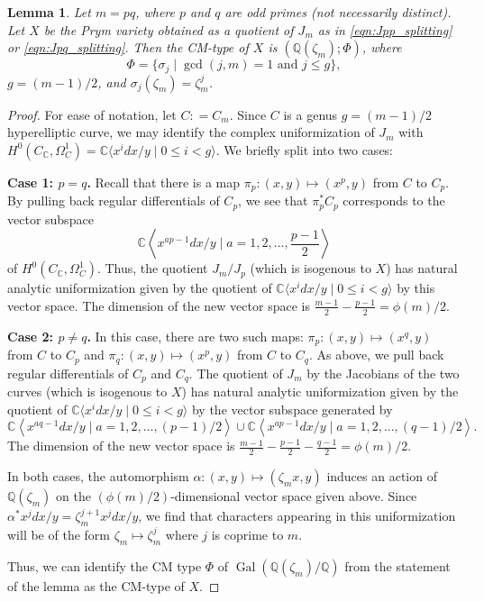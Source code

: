 \documentclass[10pt,a4paper]{amsart}
\newtheorem{lemma}{Lemma}
\newcommand{\C}{\mathbb{C}}
\DeclareMathOperator{\Gal}{Gal}
\newcommand{\Q}{\mathbb{Q}}
\begin{document}
\begin{lemma}\label{lemma:CMtype}
Let $m=pq$, where $p$ and $q$ are odd primes (not necessarily distinct). Let $X$ be the Prym variety obtained as a quotient of $J_m$ as in \eqref{eqn:Jpp_splitting} or \eqref{eqn:Jpq_splitting}. Then the CM-type of $X$ is $(\Q(\zeta_m); \Phi)$, where
$$\Phi=\{\sigma_j \mid \gcd(j,m)=1\text{ and } j\leq g\},$$ 
$g=(m-1)/2$, and $\sigma_j(\zeta_m)=\zeta_m^j$.
\end{lemma}

\begin{proof}
For ease of notation, let $C\colon=C_m$. Since $C$ is a genus $g=(m-1)/2$ hyperelliptic curve, we may identify the complex uniformization of $J_m$ with $H^0(C_\C, \Omega_C^1)=\C\langle x^idx/y\mid 0\leq i< g\rangle$. We briefly split into two cases:

\textbf{Case 1: $p=q$.} Recall that there is a map 
 $\pi_p: (x,y)\mapsto (x^{p},y)$ from $C$ to $C_p$.  By pulling back regular differentials of $C_p$, we see that $\pi_p^*C_p$ corresponds to the vector subspace $$\C\left\langle{x^{ap-1}}dx/y\mid a=1, 2, \ldots,\frac{p-1}{2}\right\rangle$$ of $H^0(C_\C, \Omega_C^1)$. 
 Thus, the quotient $J_m/J_p$ (which is isogenous to $X$) has natural analytic uniformization given by the quotient of $\C\langle x^idx/y\mid 0\leq i< g\rangle$ by this vector space. The dimension of the new vector space is $\frac{m-1}{2}-\frac{p-1}{2}=\phi(m)/2$.

\textbf{Case 2: $p\not=q$.} In this case, there are two such maps:  $\pi_p: (x,y)\mapsto (x^{q},y)$ from $C$ to $C_p$ and $\pi_q: (x,y)\mapsto (x^{p},y)$ from $C$ to $C_q$. As above, we pull back regular differentials of $C_p$ and $C_q$. The quotient of $J_m$ by the Jacobians of the two curves (which is isogenous to $X$) has  natural analytic uniformization given by the quotient of
$\C\langle x^idx/y\mid 0\leq i< g\rangle$ by the vector subspace generated by
$$\C\left\langle{x^{aq-1}}dx/y\mid a=1, 2, \ldots,({p-1})/{2}\right\rangle \cup \C\left\langle{x^{ap-1}}dx/y\mid a=1, 2, \ldots,({q-1})/{2}\right\rangle.$$
The dimension of the new vector space is $\frac{m-1}{2}-\frac{p-1}{2}-\frac{q-1}{2}=\phi(m)/2$.

In both cases, the automorphism $\alpha\colon(x,y)\mapsto (\zeta_mx,y)$ induces an action of $\Q(\zeta_m)$ on the $(\phi(m)/2)$-dimensional vector space given above. Since $\alpha^*x^jdx/y=\zeta_m^{j+1} x^jdx/y$, we find that characters appearing in this uniformization will be of the form $\zeta_m\mapsto \zeta_m^j$ where $j$ is coprime to $m$. 

Thus, we can identify the CM type $\Phi$ of $\Gal(\Q(\zeta_m)/\Q)$ from the statement of the lemma as the CM-type of  $X$.
\end{proof}
\end{document}
